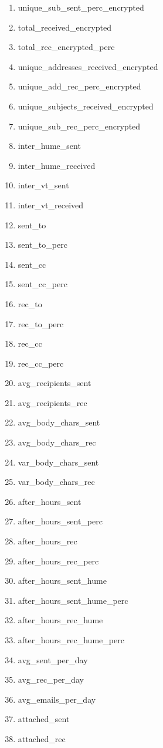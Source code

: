\documentclass[12pt]{report}
\begin{document}
\begin{multicols}{2}
\begin{enumerate}
	\item unique\_sub\_sent\_perc\_encrypted
	\item total\_received\_encrypted
	\item total\_rec\_encrypted\_perc
	\item unique\_addresses\_received\_encrypted
	\item unique\_add\_rec\_perc\_encrypted
	\item unique\_subjects\_received\_encrypted
	\item unique\_sub\_rec\_perc\_encrypted
	\item inter\_hume\_sent
	\item inter\_hume\_received
	\item inter\_vt\_sent
	\item inter\_vt\_received
	\item sent\_to
	\item sent\_to\_perc
	\item sent\_cc
	\item sent\_cc\_perc
	\item rec\_to
	\item rec\_to\_perc
	\item rec\_cc
	\item rec\_cc\_perc
	\item avg\_recipients\_sent
	\item avg\_recipients\_rec
	\item avg\_body\_chars\_sent
	\item avg\_body\_chars\_rec
	\item var\_body\_chars\_sent
	\item var\_body\_chars\_rec
	\item after\_hours\_sent
	\item after\_hours\_sent\_perc
	\item after\_hours\_rec
	\item after\_hours\_rec\_perc
	\item after\_hours\_sent\_hume
	\item after\_hours\_sent\_hume\_perc
	\item after\_hours\_rec\_hume
	\item after\_hours\_rec\_hume\_perc
	\item avg\_sent\_per\_day
	\item avg\_rec\_per\_day
	\item avg\_emails\_per\_day
	\item attached\_sent
	\item attached\_rec

\end{enumerate}
\end{multicols}
\end{document}
